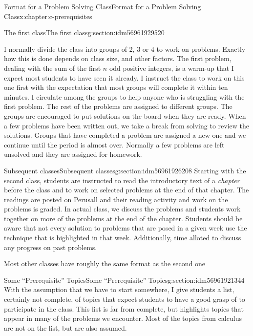 \documentclass[twoside,10pt,]{book}
\numberwithin{equation}{section}
\begin{document}
\begin{chapterptx}{Format for a Problem Solving Class}{}{Format for a Problem Solving Class}{}{}{x:chapter:c-prerequisites}
\begin{sectionptx}{The first class}{}{The first class}{}{}{g:section:idm56961929520}
\par
I normally divide the class into groups of 2, 3 or 4 to work on problems.  Exactly how this is done depends on class size, and other factors.   The first problem, dealing with the sum of the first \(n\) odd positive integers, is a warm-up that I expect most students to have seen it already.  I instruct the class to work on this one first with the expectation that most groups will complete it within ten minutes.   I circulate among the groups to help anyone who is struggling with the first problem.   The rest of the problems are assigned to different groups.  The groups are encouraged to put solutions on the board when they are ready.  When a few problems have been written out, we take a break from solving to review the solutions. Groups that have completed a problem are assigned a new one and we continue until the period is almost over.  Normally a few problems are left unsolved and they are assigned for homework.%
\end{sectionptx}
%
%
\typeout{************************************************}
\typeout{************************************************}
%
\begin{sectionptx}{Subsequent classes}{}{Subsequent classes}{}{}{g:section:idm56961926208}
Starting with the second class, students are instructed to read the introductory text of a \emph{chapter} before the class and to work on selected problems at the end of that chapter.  The readings are posted on Perusall and their reading activity and work on the problems is graded.   In actual class, we discuss the problems and students work together on more of the problems at the end of the chapter.  Students should be aware that not every solution to problems that are posed in a given week use the technique that is highlighted in that week. Additionally, time alloted to discuss any progress on past problems.%
\par
Most other classes have roughly the same format as the second one%
\end{sectionptx}
%
%
\typeout{************************************************}
\typeout{************************************************}
%
\begin{sectionptx}{Some ``Prerequisite'' Topics}{}{Some ``Prerequisite'' Topics}{}{}{g:section:idm56961921344}
With the assumption that we have to start somewhere, I give students a list, certainly not complete, of topics that expect students to have a good grasp of to participate in the class.  This list is far from complete, but highlights topics that appear in many of the problems we encounter. Most of the topics from calculus are not on the list, but are also assumed.%

\end{sectionptx}
\end{chapterptx}
\end{document}
